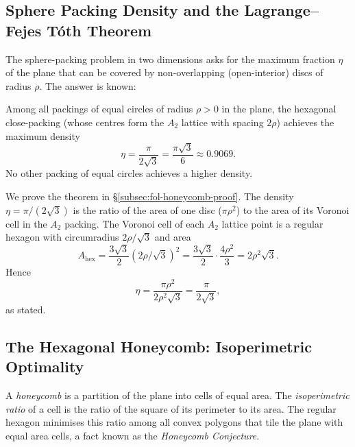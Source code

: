 \subsection{Sphere Packing Density and the Lagrange--Fejes Tóth Theorem}
\label{subsec:fol-sphere-packing}

The sphere-packing problem in two dimensions asks for the maximum fraction
\(\eta\) of the plane that can be covered by non-overlapping (open-interior)
discs of radius \(\rho\).  The answer is known:

\begin{theorem}
\label{thm:fol-hexpack}
Among all packings of equal circles of radius \(\rho>0\) in the plane,
the hexagonal close-packing (whose centres form the \(A_2\) lattice
with spacing \(2\rho\)) achieves the maximum density
\[
  \eta = \frac{\pi}{2\sqrt{3}} = \frac{\pi\sqrt{3}}{6} \approx 0.9069.
\]
No other packing of equal circles achieves a higher density.
\end{theorem}

We prove the theorem in §\ref{subsec:fol-honeycomb-proof}.
The density \(\eta = \pi/(2\sqrt{3})\) is the ratio of the area of one
disc (\(\pi\rho^2\)) to the area of its Voronoi cell in the \(A_2\) packing.
The Voronoi cell of each \(A_2\) lattice point is a regular hexagon with
circumradius \(2\rho/\sqrt{3}\) and area
\[
  A_{\mathrm{hex}} = \frac{3\sqrt{3}}{2}(2\rho/\sqrt{3})^2
                   = \frac{3\sqrt{3}}{2}\cdot\frac{4\rho^2}{3}
                   = 2\rho^2\sqrt{3}.
\]
Hence
\[
  \eta = \frac{\pi\rho^2}{2\rho^2\sqrt{3}} = \frac{\pi}{2\sqrt{3}},
\]
as stated.

\subsection{The Hexagonal Honeycomb: Isoperimetric Optimality}
\label{subsec:fol-honeycomb-isoperim}

A \emph{honeycomb} is a partition of the plane into cells of equal area.
The \emph{isoperimetric ratio} of a cell is the ratio of the square of its
perimeter to its area.  The regular hexagon minimises this ratio among all
convex polygons that tile the plane with equal area cells, a fact known
as the \emph{Honeycomb Conjecture}.

